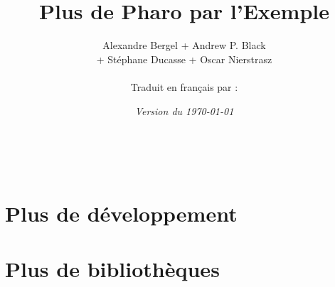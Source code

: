 \documentclass[a4paper,10pt,twoside]{book}
\begin{document}
\frontmatter
\setcounter{page}{1}
\pagestyle{headings}
\author{
  Alexandre Bergel\quad
+	Andrew P. Black\\[1ex]
+	St\'ephane Ducasse\quad
+	Oscar Nierstrasz\quad
  
	\\[4ex]
Traduit en fran\c{c}ais par :\\[2ex]
	}
\title{\Huge\bf Plus de Pharo par l'Exemple\\[1ex]} %
\numdate
{}
\date{\emph{Version du \today}}
\maketitle
~ %


\pagestyle{newheadings}
\tableofcontents
\sloppy %

\mainmatter
\part{Plus de développement}
\pagestyle{headings}

% 
% 
% 

\part{Plus de bibliothèques}
% 

\end{document}
